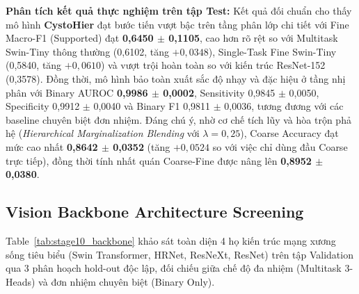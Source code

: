 \documentclass[runningheads]{llncs}
\begin{document}
\noindent \textbf{Phân tích kết quả thực nghiệm trên tập Test:} Kết quả đối chuẩn cho thấy mô hình \textbf{CystoHier} đạt bước tiến vượt bậc trên tầng phân lớp chi tiết với Fine Macro-F1 (Supported) đạt \textbf{0,6450 $\pm$ 0,1105}, cao hơn rõ rệt so với Multitask Swin-Tiny thông thường (0,6102, tăng $+0,0348$), Single-Task Fine Swin-Tiny (0,5840, tăng $+0,0610$) và vượt trội hoàn toàn so với kiến trúc ResNet-152 (0,3578). Đồng thời, mô hình bảo toàn xuất sắc độ nhạy và đặc hiệu ở tầng nhị phân với Binary AUROC \textbf{0,9986 $\pm$ 0,0002}, Sensitivity 0,9845 $\pm$ 0,0050, Specificity 0,9912 $\pm$ 0,0040 và Binary F1 0,9811 $\pm$ 0,0036, tương đương với các baseline chuyên biệt đơn nhiệm. Đáng chú ý, nhờ cơ chế tích lũy và hòa trộn phả hệ (\textit{Hierarchical Marginalization Blending} với $\lambda=0{,}25$), Coarse Accuracy đạt mức cao nhất \textbf{0,8642 $\pm$ 0,0352} (tăng $+0{,}0524$ so với việc chỉ dùng đầu Coarse trực tiếp), đồng thời tính nhất quán Coarse-Fine được nâng lên \textbf{0,8952 $\pm$ 0,0380}.

\subsection{Vision Backbone Architecture Screening}
Table~\ref{tab:stage10_backbone} khảo sát toàn diện 4 họ kiến trúc mạng xương sống tiêu biểu (Swin Transformer, HRNet, ResNeXt, ResNet) trên tập Validation qua 3 phân hoạch hold-out độc lập, đối chiếu giữa chế độ đa nhiệm (Multitask 3-Heads) và đơn nhiệm chuyên biệt (Binary Only).
\end{document}
